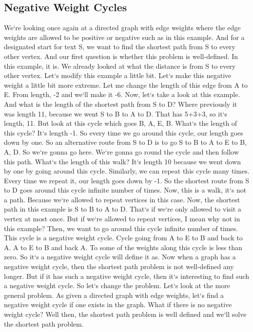 \subsection{Negative Weight Cycles}
We`re looking once again at a directed graph with edge weights where the edge weights are allowed to be positive or negative such as in this example.
And for a designated start for text S, we want to find the shortest path from S to every other vertex.
And our first question is whether this problem is well-defined.
In this example, it is.
We already looked at what the distance is from S to every other vertex.
Let`s modify this example a little bit.
Let`s make this negative weight a little bit more extreme.
Let me change the length of this edge from A to E\@.
From length, -2 and we`ll make it -6.
Now, let`s take a look at this example.
And what is the length of the shortest path from S to D? Where previously it was length 11, because we went S to B to A to D\@.
That has 5+3+3, so it`s length, 11.
But look at this cycle which goes B, A, E, B\@.
What`s the length of this cycle? It`s length -1.
So every time we go around this cycle, our length goes down by one.
So an alternative route from S to D is to go S to B to A to E to B, A, D\@.
So we`re gonna go here.
We`re gonna go round the cycle and then follow this path.
What`s the length of this walk? It`s length 10 because we went down by one by going around this cycle.
Similarly, we can repeat this cycle many times.
Every time we repeat it, our length goes down by -1.
So the shortest route from S to D goes around this cycle infinite number of times.
Now, this is a walk, it`s not a path.
Because we`re allowed to repeat vertices in this case.
Now, the shortest path in this example is S to B to A to D\@.
That`s if we`re only allowed to visit a vertex at most once.
But if we`re allowed to repeat vertices, I mean why not in this example? Then, we want to go around this cycle infinite number of times.
This cycle is a negative weight cycle.
Cycle going from A to E to B and back to A\@.
A to E to B and back A\@.
To some of the weights along this cycle is less than zero.
So it`s a negative weight cycle will define it as.
Now when a graph has a negative weight cycle, then the shortest path problem is not well-defined any longer.
But if it has such a negative weight cycle, then it`s interesting to find such a negative weight cycle.
So let`s change the problem.
Let`s look at the more general problem.
As given a directed graph with edge weights, let`s find a negative weight cycle if one exists in the graph.
What if there is no negative weight cycle? Well then, the shortest path problem is well defined and we`ll solve the shortest path problem.
